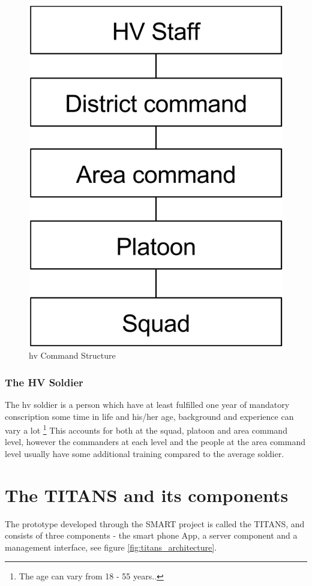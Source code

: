 \begin{figure}
\label{fig:hv_command_structure}
\centering
\includegraphics[width=0.4\columnwidth]{content/img/hv_command_structure.png}
\caption{\gls{hv} Command Structure}
\end{figure}

\subsubsection{The HV Soldier}
The \gls{hv} soldier is a person which have at least fulfilled one year of mandatory conscription some time in life and his/her age, background and experience can vary a lot \footnote{The age can vary from 18 - 55 years.\cite{lov_hv_2015}.} 
This accounts for both at the squad, platoon and area command level, however the commanders at each level and the people at the area command level usually have some additional training compared to the average soldier. 

\section{The TITANS and its components} \label{sec:titans_components}
The prototype developed through the SMART project is called the TITANS, and consists of three components - the smart phone App, a server component and a management interface, see figure \ref{fig:titans_architecture}.

